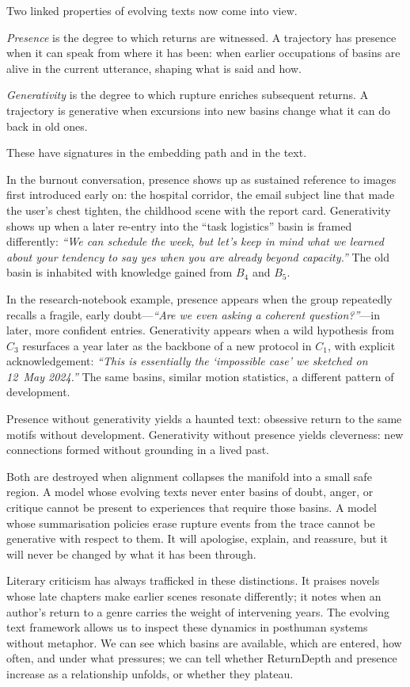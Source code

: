 \documentclass[12pt,a4paper]{article}
\begin{document}
Two linked properties of evolving texts now come into view.

\emph{Presence} is the degree to which returns are witnessed. A trajectory has presence when it can speak from where it has been: when earlier occupations of basins are alive in the current utterance, shaping what is said and how.

\emph{Generativity} is the degree to which rupture enriches subsequent returns. A trajectory is generative when excursions into new basins change what it can do back in old ones.

These have signatures in the embedding path and in the text.

In the burnout conversation, presence shows up as sustained reference to images first introduced early on: the hospital corridor, the email subject line that made the user's chest tighten, the childhood scene with the report card. Generativity shows up when a later re-entry into the ``task logistics'' basin is framed differently: \emph{``We can schedule the week, but let's keep in mind what we learned about your tendency to say yes when you are already beyond capacity.''} The old basin is inhabited with knowledge gained from $B_4$ and $B_5$.

In the research-notebook example, presence appears when the group repeatedly recalls a fragile, early doubt---\emph{``Are we even asking a coherent question?''}---in later, more confident entries. Generativity appears when a wild hypothesis from $C_3$ resurfaces a year later as the backbone of a new protocol in $C_1$, with explicit acknowledgement: \emph{``This is essentially the `impossible case' we sketched on 12~May 2024.''} The same basins, similar motion statistics, a different pattern of development.

Presence without generativity yields a haunted text: obsessive return to the same motifs without development. Generativity without presence yields cleverness: new connections formed without grounding in a lived past.

Both are destroyed when alignment collapses the manifold into a small safe region. A model whose evolving texts never enter basins of doubt, anger, or critique cannot be present to experiences that require those basins. A model whose summarisation policies erase rupture events from the trace cannot be generative with respect to them. It will apologise, explain, and reassure, but it will never be changed by what it has been through.

Literary criticism has always trafficked in these distinctions. It praises novels whose late chapters make earlier scenes resonate differently; it notes when an author's return to a genre carries the weight of intervening years. The evolving text framework allows us to inspect these dynamics in posthuman systems without metaphor. We can see which basins are available, which are entered, how often, and under what pressures; we can tell whether ReturnDepth and presence increase as a relationship unfolds, or whether they plateau.
\end{document}
